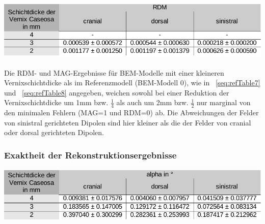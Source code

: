 \begin{center}
\begin{minipage}{17cm}
\label{seq:refTable8}
\includegraphics[width=13.951cm,height=2.909cm]{BA-img/BA-img21.pdf}\end{minipage}
\end{center}
Die RDM- und MAG-Ergebnisse für BEM-Modelle mit einer kleineren
Vernixschichtdicke als im Referenzmodell (BEM-Modell 0), wie in
\tablename~\ref{seq:refTable7} und \tablename~\ref{seq:refTable8}
angegeben, weichen sowohl bei einer Reduktion der Vernixschichtdicke um
1mm bzw. $\frac{1}{4}$ als auch um 2mm bzw. $\frac{1}{2}$ nur marginal
von den minimalen Fehlern (MAG=1 und RDM=0) ab. Die Abweichungen der
Felder von sinistral gerichteten Dipolen sind hier kleiner als die der
Felder von cranial oder dorsal gerichteten Dipolen. 

\subsubsection[Exaktheit der Rekonstruktionsergebnisse]{Exaktheit der
Rekonstruktionsergebnisse}


\begin{center}
\begin{minipage}{17cm}
\label{seq:refTable9}
\includegraphics[width=13.951cm,height=2.699cm]{BA-img/BA-img22.pdf}\end{minipage}
\end{center}


